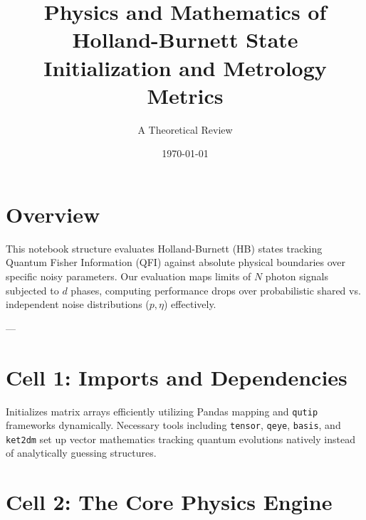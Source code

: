 \documentclass[12pt]{article}
\title{Physics and Mathematics of Holland-Burnett State Initialization and Metrology Metrics}
\author{A Theoretical Review}
\date{\today}
\begin{document}
\maketitle

\section*{Overview}
This notebook structure evaluates Holland-Burnett (HB) states tracking Quantum Fisher Information (QFI) against absolute physical boundaries over specific noisy parameters. Our evaluation maps limits of $N$ photon signals subjected to $d$ phases, computing performance drops over probabilistic shared vs. independent noise distributions ($p, \eta$) effectively.

---

\section*{Cell 1: Imports and Dependencies}
Initializes matrix arrays efficiently utilizing Pandas mapping and \texttt{qutip} frameworks dynamically. Necessary tools including \texttt{tensor}, \texttt{qeye}, \texttt{basis}, and \texttt{ket2dm} set up vector mathematics tracking quantum evolutions natively instead of analytically guessing structures.

\section*{Cell 2: The Core Physics Engine}
\end{document}
